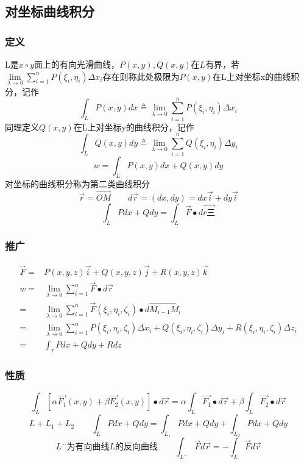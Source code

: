 \subsection{对坐标曲线积分}
\subsubsection{定义}
L是$x\circ y$面上的有向光滑曲线，$P(x,y),Q(x,y)$在$L$有界，若$\lim\limits_{\lambda\to 0}\sum\limits_{i=1}^{n}P(\xi_i,\eta_i)\Delta x_i$存在则称此处极限为$P(x,y)$在L上对坐标x的曲线积分，记作
$$\int_{L}P(x,y)dx\triangleq\lim\limits_{\lambda\to 0}\sum\limits_{i=1}^{n}P(\xi_i,\eta_i)\Delta x_i$$
同理定义$Q(x,y)$在L上对坐标y的曲线积分，记作
$$\int_{L}Q(x,y)dy\triangleq\lim\limits_{\lambda\to 0}\sum\limits_{i=1}^{n}Q(\xi_i,\eta_i)\Delta y_i$$
$$w=\int_{L}P(x,y)dx+Q(x,y)dy$$
对坐标的曲线积分称为第二类曲线积分
$$\overrightarrow{r}=\overrightarrow{OM}\qquad d\overrightarrow{r}=(dx,dy)=dx\overrightarrow{i}+dy\overrightarrow{i}$$
$$\int_LPdx+Qdy=\int_L\overrightarrow{F}\bullet d\overrightarrow{r三}$$
\subsubsection{推广}
\begin{align*}
	\overrightarrow{F}=&P(x,y,z)\overrightarrow{i}+Q(x,y,z)\overrightarrow{j}+R(x,y,z)\overrightarrow{k}\\
	w=&\lim\limits_{\lambda\to 0}\sum\limits_{i=1}^{n}\overrightarrow{F}\bullet d\overrightarrow{r}\\
	=&\lim\limits_{\lambda\to 0}\sum\limits_{i=1}^{n}\overrightarrow{F}(\xi_i,\eta_i,\zeta_i)\bullet d\overrightarrow{M_{i-1}M_i}\\
	=&\lim\limits_{\lambda\to 0}\sum\limits_{i=1}^{n}P(\xi_i,\eta_i,\zeta_i)\Delta x_i+Q(\xi_i,\eta_i,\zeta_i)\Delta y_i+R(\xi_i,\eta_i,\zeta_i)\Delta z_i\\
	=&\int_\tau Pdx+Qdy+Rdz
\end{align*}
\subsubsection{性质}
$$\int_{L}\left[\alpha\overrightarrow{F_1}(x,y)+\beta\overrightarrow{F_2}(x,y)\right]\bullet d\overrightarrow{r}=\alpha\int_{L}\overrightarrow{F_1}\bullet d\overrightarrow{r}+\beta\int_{L}\overrightarrow{F_2}\bullet d\overrightarrow{r}$$
$$L+L_1+L_2\qquad \int_L Pdx+Qdy=\int_{L_1} Pdx+Qdy+\int_{L_2} Pdx+Qdy$$
$$L^-\mbox{为有向曲线}L\mbox{的反向曲线}\qquad \int_{L^-}\overrightarrow{F}d\overrightarrow{r}=-\int_{L}\overrightarrow{F}d\overrightarrow{r}$$
